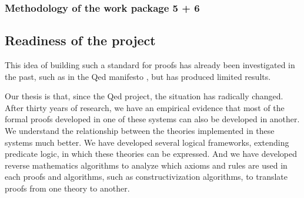 \subsubsection{Methodology of the work package 5 + 6}


\subsection{Readiness of the project}

This idea of building such a standard for proofs has already been
investigated in the past, such as in the Qed manifesto \cite{Qed94}, but
has produced limited results.

Our thesis is that, since the
Qed project, the situation has radically changed. After
thirty years of research, we have an empirical evidence that most of
the formal proofs developed in one of these systems can also be
developed in another. We understand the relationship between the
theories implemented in these systems much better. We have developed
several logical frameworks, extending predicate logic, in which these
theories can be expressed. And we have developed reverse mathematics
algorithms to analyze which axioms and rules are used in each proofs
and algorithms, such as constructivization algorithms, to translate
proofs from one theory to another.


